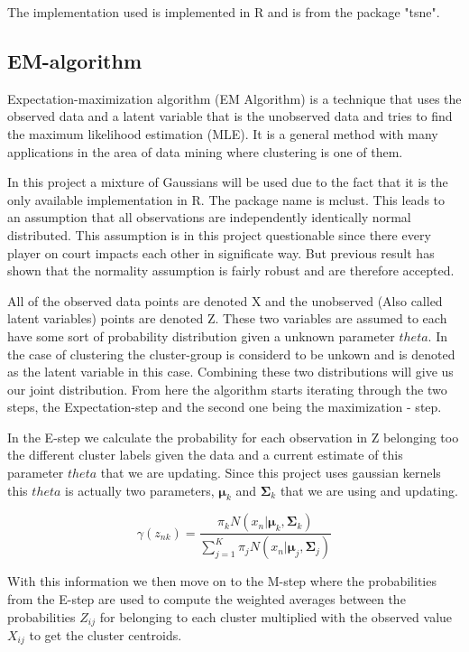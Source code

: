 \documentclass{article}
\begin{document}
The implementation used is implemented in R and is from the package "tsne".




\subsection{EM-algorithm}

Expectation-maximization algorithm (EM Algorithm) is a technique that uses the observed data and a latent variable that is the unobserved data and tries to find the maximum likelihood estimation (MLE). It is a general method with many applications in the area of data mining where clustering is one of them.

In this project a mixture of Gaussians will be used due to the fact that it is the only available implementation in R. The package name is mclust. This leads to an assumption that all observations are independently identically normal distributed. This assumption is in this project questionable since there every player on court impacts each other in significate way. But previous result has shown that the normality assumption is fairly robust and are therefore accepted.

All of the observed data points are denoted X and the unobserved (Also called latent variables) points are denoted Z. These two variables are assumed to each have some sort of probability distribution given a unknown parameter $theta$. In the case of clustering the cluster-group is considerd to be unkown and is denoted as the latent variable in this case. Combining these two distributions will give us our joint distribution. From here the algorithm starts iterating through the two steps, the Expectation-step and the second one being the maximization - step.

In the E-step we calculate the probability for each observation in Z belonging too the different cluster labels given the data and a current estimate of this parameter $theta$ that we are updating. Since this project uses gaussian kernels this $theta$ is actually two parameters, $\mathbf{\mu}_k$ and $\mathbf{\Sigma}_k$ that we are using and updating.


$$\gamma(z_{nk}) = \frac{\pi_k N(x_n|\mathbf{\mu}_k,\mathbf{\Sigma}_k)} {\sum_{j=1}^{K}  \pi_jN(x_n|\mathbf{\mu}_j,\mathbf{\Sigma}_j)}$$

With this information we then move on to the M-step where the probabilities from the E-step are used to compute the weighted averages between the probabilities $Z_{ij}$ for belonging to each cluster multiplied with the observed value $X_{ij}$ to get the cluster centroids.
\end{document}
